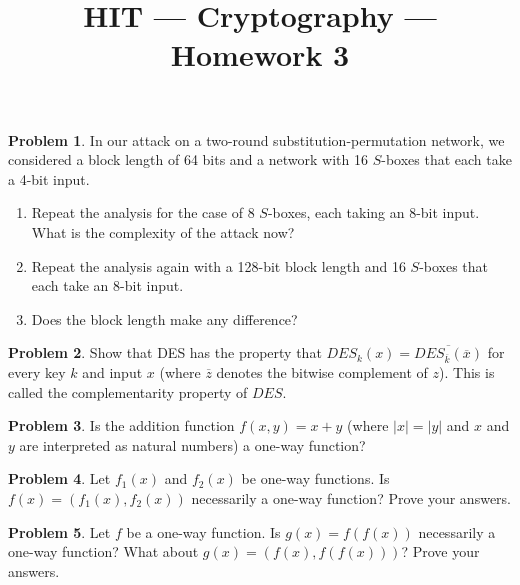 \documentclass[11pt]{article}
\title{HIT --- Cryptography --- Homework 3}
\theoremstyle{definition}
\newtheorem{problem}{Problem}
\begin{document}
\maketitle

\begin{problem}
In our attack on a two-round substitution-permutation network, we considered a block length of 64 bits and a network with 16 $S$-boxes that each take a 4-bit input. 
\begin{enumerate}
\item Repeat the analysis for the case of 8 $S$-boxes, each taking an 8-bit input. What is the complexity of the attack now?
\item Repeat the analysis again with a 128-bit block length and 16 $S$-boxes that each take an 8-bit input.
\item Does the block length make any difference?
\end{enumerate}
\end{problem}

\begin{problem}
Show that DES has the property that $DES_k(x) = \overline{DES_{\overline{k}}(\overline{x})}$ for every key $k$ and input $x$ (where $\overline{z}$ denotes the bitwise complement of $z$). This is called the complementarity property of $DES$.
\end{problem}

\begin{problem}
Is the addition function $f(x, y) = x + y$ (where $|x| = |y|$ and $x$ and $y$ are interpreted as natural numbers) a one-way function?
\end{problem}

\begin{problem}
Let $f_{1}(x)$ and $f_{2}(x)$ be one-way functions. Is $f(x) = (f_{1}(x), f_{2}(x))$ necessarily a one-way function? Prove your answers.
\end{problem}

\begin{problem}
Let $f$ be a one-way function. Is $g(x) = f(f(x))$ necessarily a one-way function? What about $g(x) = (f(x),f(f(x)))$? Prove your answers.
\end{problem}
\end{document}
